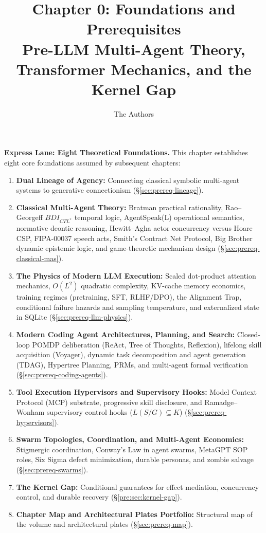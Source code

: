 \documentclass[11pt,a4paper]{article}
\title{\textbf{Chapter 0: Foundations and Prerequisites}\\
\large Pre-LLM Multi-Agent Theory, Transformer Mechanics, and the Kernel Gap}
\author{The Authors}
\date{\pdeditiondate}
\begin{document}
\maketitle


\noindent\textbf{Express Lane: Eight Theoretical Foundations.} This chapter establishes eight core foundations assumed by subsequent chapters:
\begin{enumerate}[leftmargin=1.8em,itemsep=3pt]
  \item \textbf{Dual Lineage of Agency:} Connecting classical symbolic multi-agent systems to generative connectionism (\S\ref{sec:prereq-lineage}).
  \item \textbf{Classical Multi-Agent Theory:} Bratman practical rationality, Rao--Georgeff $BDI_{CTL^*}$ temporal logic, AgentSpeak(L) operational semantics, normative deontic reasoning, Hewitt--Agha actor concurrency versus Hoare CSP, FIPA-00037 speech acts, Smith's Contract Net Protocol, Big Brother dynamic epistemic logic, and game-theoretic mechanism design (\S\ref{sec:prereq-classical-mas}).
  \item \textbf{The Physics of Modern LLM Execution:} Scaled dot-product attention mechanics, $O(L^2)$ quadratic complexity, KV-cache memory economics, training regimes (pretraining, SFT, RLHF/DPO), the Alignment Trap, conditional failure hazards and sampling temperature, and externalized state in SQLite (\S\ref{sec:prereq-llm-physics}).
  \item \textbf{Modern Coding Agent Architectures, Planning, and Search:} Closed-loop POMDP deliberation (ReAct, Tree of Thoughts, Reflexion), lifelong skill acquisition (Voyager), dynamic task decomposition and agent generation (TDAG), Hypertree Planning, PRMs, and multi-agent formal verification (\S\ref{sec:prereq-coding-agents}).
  \item \textbf{Tool Execution Hypervisors and Supervisory Hooks:} Model Context Protocol (MCP) substrate, progressive skill disclosure, and Ramadge--Wonham supervisory control hooks ($L(S/G) \subseteq K$) (\S\ref{sec:prereq-hypervisors}).
  \item \textbf{Swarm Topologies, Coordination, and Multi-Agent Economics:} Stigmergic coordination, Conway's Law in agent swarms, MetaGPT SOP roles, Six Sigma defect minimization, durable personas, and zombie salvage (\S\ref{sec:prereq-swarms}).
  \item \textbf{The Kernel Gap:} Conditional guarantees for effect mediation, concurrency control, and durable recovery (\S\ref{pre:sec:kernel-gap}).
  \item \textbf{Chapter Map and Architectural Plates Portfolio:} Structural map of the volume and architectural plates (\S\ref{sec:prereq-map}).
\end{enumerate}
\end{document}
